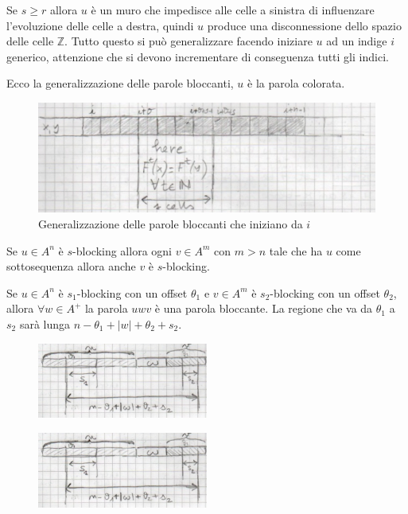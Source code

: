 Se $s\ge r$ allora $u$ è un muro che impedisce alle celle a sinistra di influenzare
l'evoluzione delle celle a destra, quindi $u$ produce una disconnessione dello
spazio delle celle $\mathbb{Z}$. Tutto questo si può generalizzare facendo iniziare
$u$ ad un indige $i$ generico, attenzione che si devono incrementare di conseguenza
tutti gli indici.

\begin{nota}
    Ecco la generalizzazione delle parole bloccanti, $u$ è la parola colorata.
    \begin{figure}[!h]
        \centering
        \includegraphics[width=.7\textwidth]{img/sistemi_complessi/parola_bloccante.png}
        \caption{Generalizzazione delle parole bloccanti che iniziano da $i$}
        \label{fig:parola_bloccante}
    \end{figure}
\end{nota}

\begin{nota}
    Se $u\in A^n$ è $s$-blocking allora ogni $v\in A^m$ con $m>n$ tale che ha
    $u$ come sottosequenza allora anche $v$ è $s$-blocking.
\end{nota}

\begin{nota}
    Se $u\in A^n$ è $s_1$-blocking con un offset $\theta_1$ e $v\in A^m$ è  $s_2$-blocking
    con un offset $\theta_2$, allora $\forall w \in A^+$ la parola $uwv$ è una parola
    bloccante.
    La regione che va da $\theta_1$ a $s_2$ sarà lunga $n - \theta_1 + | w | + \theta_2 + s_2$.
    \begin{figure}[!h]
        \centering
        \includegraphics[width=0.5\textwidth]{img/sistemi_complessi/blocking_word_1.png}
    \end{figure}
    \begin{figure}[!h]
        \centering
        \includegraphics[width=0.5\textwidth]{img/sistemi_complessi/blocking_word_1.png}
    \end{figure}
\end{nota}

